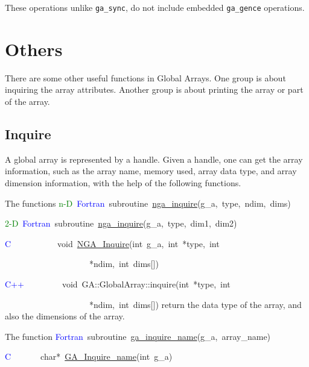These operations unlike \texttt{ga\_sync}, do not include embedded
\texttt{ga\_gence} operations. 


\section{Others }

There are some other useful functions in Global Arrays. One group
is about inquiring the array attributes. Another group is about printing
the array or part of the array. 


\subsection{Inquire }

A global array is represented by a handle. Given a handle, one can
get the array information, such as the array name, memory used, array
data type, and array dimension information, with the help of the following
functions.

The functions
\textcolor{green}{n-D}~\textcolor{blue}{Fortran}~subroutine~\href{http://www.emsl.pnl.gov/docs/global/ga_ops.html\#ga_inquire}{nga\_{}inquire}(g\_a,~type,~ndim,~dims)~

\textcolor{green}{2-D}~\textcolor{blue}{Fortran}~subroutine~\href{http://www.emsl.pnl.gov/docs/global/ga_ops.html\#ga_inquire}{nga\_{}inquire}(g\_a,~type,~dim1,~dim2)~

\textcolor{blue}{C}~~~~~~~~~~~void~\href{http://www.emsl.pnl.gov/docs/global/c_nga_ops.html\#ga_inquire}{NGA\_{}Inquire}(int~g\_a,~int~{*}type,~int~

~~~~~~~~~~~~~~~~~~~~{*}ndim,~int~dims{[}{]})~

\textcolor{blue}{C++}~~~~~~~~~void~GA::GlobalArray::inquire(int~{*}type,~int~

~~~~~~~~~~~~~~~~~~~~{*}ndim,~int~dims{[}{]})
return the data type of the array, and also the dimensions of the
array.

The function
\textcolor{blue}{Fortran}~subroutine~\href{http://www.emsl.pnl.gov/docs/global/ga_ops.html\#ga_inquire_name}{ga\_{}inquire\_{}name}(g\_a,~array\_name)~

\textcolor{blue}{C}~~~~~~~char{*}~\href{http://www.emsl.pnl.gov/docs/global/c_nga_ops.html\#ga_inquire_name}{GA\_{}Inquire\_{}name}(int~g\_a)~~

